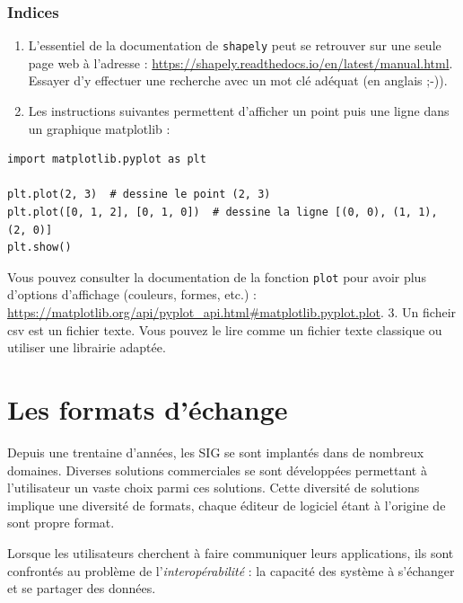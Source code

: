 \documentclass[11pt]{article}
\newcommand{\passthrough}[1]{#1}
\def\tightlist{}
\begin{document}
\hypertarget{indices}{%
\subsubsection{Indices}\label{indices}}

\begin{enumerate}
\def\labelenumi{\arabic{enumi}.}
\tightlist
\item
  L'essentiel de la documentation de \passthrough{\lstinline!shapely!}
  peut se retrouver sur une seule page web à l'adresse :
  \url{https://shapely.readthedocs.io/en/latest/manual.html}. Essayer
  d'y effectuer une recherche avec un mot clé adéquat (en anglais ;-)).
\item
  Les instructions suivantes permettent d'afficher un point puis une
  ligne dans un graphique matplotlib :
\end{enumerate}

\begin{lstlisting}
import matplotlib.pyplot as plt

plt.plot(2, 3)  # dessine le point (2, 3)
plt.plot([0, 1, 2], [0, 1, 0])  # dessine la ligne [(0, 0), (1, 1), (2, 0)]
plt.show()
\end{lstlisting}

Vous pouvez consulter la documentation de la fonction
\passthrough{\lstinline!plot!} pour avoir plus d'options d'affichage
(couleurs, formes, etc.) :
\url{https://matplotlib.org/api/pyplot_api.html\#matplotlib.pyplot.plot}.
3. Un ficheir csv est un fichier texte. Vous pouvez le lire comme un
fichier texte classique ou utiliser une librairie adaptée.

\hypertarget{les-formats-duxe9change}{%
\section{Les formats d'échange}\label{les-formats-duxe9change}}

Depuis une trentaine d'années, les SIG se sont implantés dans de
nombreux domaines. Diverses solutions commerciales se sont développées
permettant à l'utilisateur un vaste choix parmi ces solutions. Cette
diversité de solutions implique une diversité de formats, chaque éditeur
de logiciel étant à l'origine de sont propre format.

Lorsque les utilisateurs cherchent à faire communiquer leurs
applications, ils sont confrontés au problème de
l'\emph{interopérabilité} : la capacité des système à s'échanger et se
partager des données.
\end{document}
